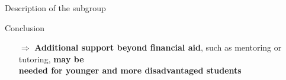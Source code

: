 \documentclass[aspectratio=169]{beamer}
\begin{document}
\begin{frame}{Description of the subgroup}
 \begin{exampleblock}{Conclusion}
\vspace{-4pt}
\begin{itemize}
    \item [$\Rightarrow$]
\textbf{Additional support beyond financial aid}, such as mentoring or tutoring, \textbf{may be \\ needed for younger and more disadvantaged students}
\end{itemize}
\vspace{-4pt}
\end{exampleblock}


\end{frame}






\end{document}
